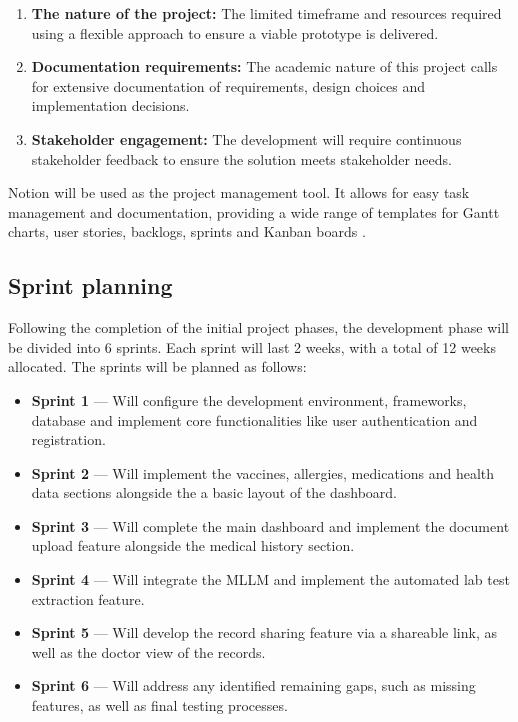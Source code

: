 \begin{enumerate}
    \item \textbf{The nature of the project:} The limited timeframe and resources required using a flexible approach to ensure a viable prototype is delivered.
    \item \textbf{Documentation requirements:} The academic nature of this project calls for extensive documentation of requirements, design choices and implementation decisions. 
    \item \textbf{Stakeholder engagement:} The development will require continuous stakeholder feedback to ensure the solution meets stakeholder needs.
\end{enumerate}

Notion will be used as the project management tool. It allows for easy task management and documentation, providing a wide range of templates for Gantt charts, user stories, backlogs, sprints and Kanban boards \parencite{notion}. 

\subsection{Sprint planning}

Following the completion of the initial project phases, the development phase will be divided into 6 sprints. Each sprint will last 2 weeks, with a total of 12 weeks allocated. The sprints will be planned as follows:

\begin{itemize}
    \item \textbf{Sprint 1} --- Will configure the development environment, frameworks, database and implement core functionalities like user authentication and registration.
    \item \textbf{Sprint 2} --- Will implement the vaccines, allergies, medications and health data sections alongside the a basic layout of the dashboard.
    \item \textbf{Sprint 3} --- Will complete the main dashboard and implement the document upload feature alongside the medical history section.
    \item \textbf{Sprint 4} --- Will integrate the MLLM and implement the automated lab test extraction feature.
    \item \textbf{Sprint 5} --- Will develop the record sharing feature via a shareable link, as well as the doctor view of the records.
    \item \textbf{Sprint 6} --- Will address any identified remaining gaps, such as missing features, as well as final testing processes.
\end{itemize}
